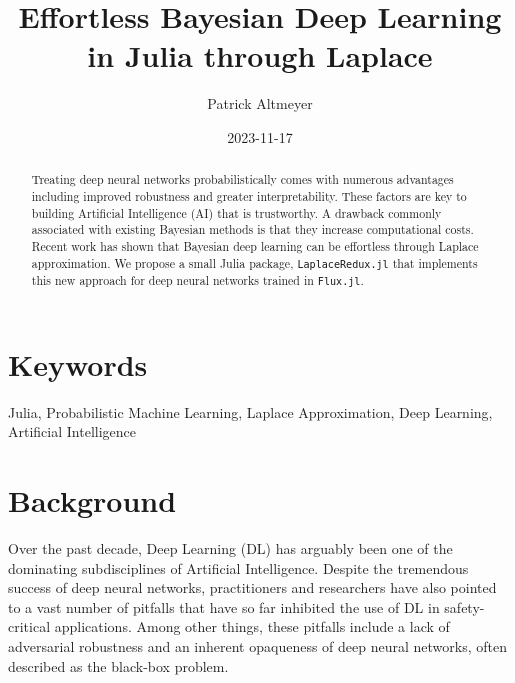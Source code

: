 \documentclass{juliacon}
\title{Effortless Bayesian Deep Learning in Julia through Laplace}
\author[1]{Patrick Altmeyer}
\affil[1]{Delft University of Technology}
\date{2023-11-17}
\providecommand{\JCONkeywords}[1]
{
  \small	
  \section*{Keywords} #1
}
\begin{document}
\maketitle

\begin{abstract}

Treating deep neural networks probabilistically comes with numerous
advantages including improved robustness and greater interpretability.
These factors are key to building Artificial Intelligence (AI) that is
trustworthy. A drawback commonly associated with existing Bayesian
methods is that they increase computational costs. Recent work has shown
that Bayesian deep learning can be effortless through Laplace
approximation. We propose a small Julia package,
\texttt{LaplaceRedux.jl} that implements this new approach for deep
neural networks trained in \texttt{Flux.jl}.
\end{abstract}

\JCONkeywords{Julia, Probabilistic Machine Learning, Laplace
Approximation, Deep Learning, Artificial Intelligence}


\setcounter{page}{1}

\ifdefined\Shaded\renewenvironment{Shaded}{\begin{tcolorbox}[interior hidden, breakable, sharp corners, enhanced, boxrule=0pt, frame hidden, borderline west={3pt}{0pt}{shadecolor}]}{\end{tcolorbox}}\fi

\hypertarget{sec-intro}{%
\section{Background}\label{sec-intro}}

Over the past decade, Deep Learning (DL) has arguably been one of the
dominating subdisciplines of Artificial Intelligence. Despite the
tremendous success of deep neural networks, practitioners and
researchers have also pointed to a vast number of pitfalls that have so
far inhibited the use of DL in safety-critical applications. Among other
things, these pitfalls include a lack of adversarial robustness
\autocite{goodfellow2014explaining} and an inherent opaqueness of deep
neural networks, often described as the black-box problem.
\end{document}
